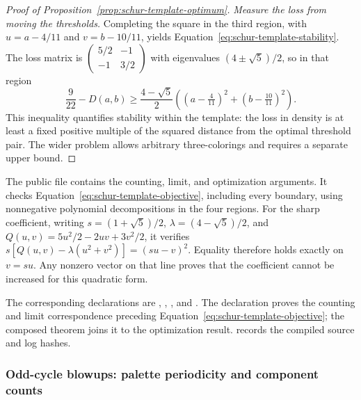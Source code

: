 \begin{proof}[Proof of Proposition~\ref{prop:schur-template-optimum}]
\textit{Measure the loss from moving the thresholds.}
Completing the square in the third region, with
$u=a-4/11$ and $v=b-10/11$, yields
Equation~\eqref{eq:schur-template-stability}. The loss matrix is
$\left(\begin{smallmatrix}5/2&-1\\-1&3/2\end{smallmatrix}\right)$
with eigenvalues $(4\pm\sqrt5)/2$, so in that region
\[
 \frac9{22}-D(a,b)\ge
 \frac{4-\sqrt5}{2}\left((a-\tfrac4{11})^2+(b-\tfrac{10}{11})^2\right).
\]
This inequality quantifies stability within the template: the loss
in density is at least a fixed positive multiple of the squared distance
from the optimal threshold pair. The wider problem allows arbitrary
three-colorings and requires a separate upper bound.
\end{proof}

The public file 
contains the counting, limit, and optimization arguments. It checks
Equation~\eqref{eq:schur-template-objective}, including every boundary,
using nonnegative polynomial decompositions in the four regions.
For the sharp coefficient, writing $s=(1+\sqrt5)/2$,
$\lambda=(4-\sqrt5)/2$, and
$Q(u,v)=5u^2/2-2uv+3v^2/2$, it verifies
$s[Q(u,v)-\lambda(u^2+v^2)]=(su-v)^2$.
Equality therefore holds exactly on $v=su$. Any nonzero vector on
that line proves that the coefficient cannot be increased for this
quadratic form.

The corresponding declarations are
,
, , and
.
The declaration  proves the counting and limit
correspondence preceding Equation~\eqref{eq:schur-template-objective};
the composed theorem joins it to the optimization result.
 records the compiled
source and log hashes.

\subsubsection{Odd-cycle blowups: palette periodicity and component counts}
\label{app:cycle-blowup-proof}

